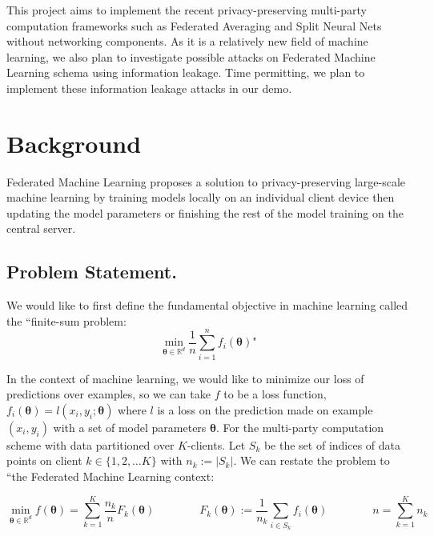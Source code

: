 \documentclass[12pt]{article}
\renewcommand{\vec}[1]{\boldsymbol{\mathbf{#1}}}
\begin{document}
	\noindent This project aims to implement the recent privacy-preserving multi-party computation frameworks such as Federated Averaging and Split Neural Nets without networking components. As it is a relatively new field of machine learning, we also plan to investigate possible attacks on Federated Machine Learning schema using information leakage. Time permitting, we plan to implement these information leakage attacks in our demo.
	
	\section{Background}
	Federated Machine Learning proposes a solution to privacy-preserving large-scale machine learning by training models locally on an individual client device then updating the model parameters or finishing the rest of the model training on the central server.
	
	\vspace{3mm}
	
	\subsection*{Problem Statement.}
	
    \noindent We would like to first define the fundamental objective in machine learning called the ``finite-sum problem:
	$$ \min_{\vec{\theta} \in \mathbb{R}^d} \frac{1}{n} \sum_{i=1}^n f_i(\vec{\theta})\text{"} $$
	
	\noindent In the context of machine learning, we would like to minimize our loss of predictions over examples, so we can take $f$ to be a loss function, $f_i(\vec{\theta}) = l(x_i, y_i; \vec{\theta})$ where $l$ is a loss on the prediction made on example $(x_i, y_i)$ with a set of model parameters $\vec{\theta}$. For the multi-party computation scheme with data partitioned over $K$-clients. Let $S_k$ be the set of indices of data points on client $k \in \{1, 2, \dots K \}$ with $n_k := |S_k|$. We can restate the problem to ``the Federated Machine Learning context:
	
	$$ \min_{\vec{\theta} \in \mathbb{R}^d} f(\vec{\theta}) = \sum_{k=1}^K \frac{n_k}{n} F_k(\vec{\theta}) \qquad \qquad F_k(\vec{\theta}) := \frac{1}{n_k} \sum_{i \in S_k} f_i(\vec{\theta}) \qquad \qquad n = \sum_{k=1}^K n_k$$
	
	\vspace{3mm}
	
\end{document}
